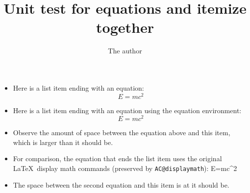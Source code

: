 \documentclass{article}
\title{Unit test for equations and itemize together}
\author{The author}
\begin{document}
\maketitle

\begin{itemize}

\item Here is a list item ending with an equation:
\[
E=mc^2
\]

\item Here is a list item ending with an equation using the equation environment:
\begin{equation}
E=mc^2
\end{equation}

\item Observe the amount of space between the equation above and this item, which is larger than it should be.

\item For comparison, the equation that ends the list item uses the original \LaTeX\ display math commands (preserved by \texttt{AC@displaymath}):
\makeatletter
\AC@displaymath
E=mc^2
\AC@enddisplaymath
\makeatother

\item The space between the second equation and this item is at it should be.

\end{itemize}
\end{document}
